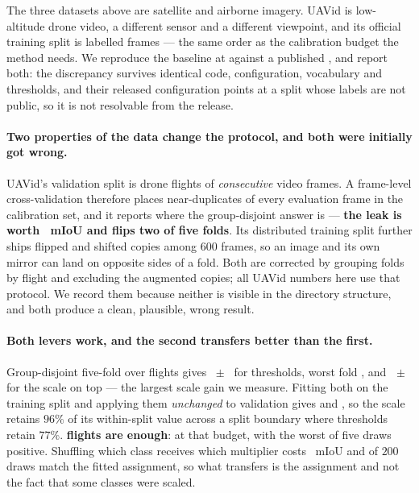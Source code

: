 \documentclass[10pt,a4paper]{article}                        %
\newcommand{\best}[1]{\textbf{#1}}
\begin{document}
The three datasets above are satellite and airborne imagery. UAVid is low-altitude
drone video, a different sensor and a different viewpoint, and its official
training split is \uavTrainTiles{} labelled frames --- the same order as the
calibration budget the method needs. We reproduce the baseline at \uavBase{}
against a published \uavPub{}, and report both: the \uavGap{} discrepancy survives
identical code, configuration, vocabulary and thresholds, and their released
configuration points at a split whose labels are not public, so it is not
resolvable from the release.

\paragraph{Two properties of the data change the protocol, and both were initially
got wrong.} UAVid's validation split is \uavValScenes{} drone flights of
\uavFrames{} \emph{consecutive} video frames. A frame-level cross-validation
therefore places near-duplicates of every evaluation frame in the calibration set,
and it reports \uavLeakA{} where the group-disjoint answer is \uavLeakB{} ---
\best{the leak is worth \uavLeak{}~mIoU and flips two of five folds}. Its
distributed training split further ships \uavAug{} flipped and shifted copies among
$600$ frames, so an image and its own mirror can land on opposite sides of a fold.
Both are corrected by grouping folds by flight and excluding the augmented copies;
all UAVid numbers here use that protocol. We record them because neither is visible
in the directory structure, and both produce a clean, plausible, wrong result.

\paragraph{Both levers work, and the second transfers better than the first.}
Group-disjoint five-fold over \uavScenes{} flights gives \uavTauCV{}~$\pm$~\uavTauSD{}
for thresholds, worst fold \uavTauWorst{}, and \best{\uavScaleCV{}~$\pm$~\uavScaleSD{}}
for the scale on top --- the largest scale gain we measure. Fitting both on the
training split and applying them \emph{unchanged} to validation gives \uavTauTrans{}
and \uavScaleTrans{}, so the scale retains $96\%$ of its within-split value across a
split boundary where thresholds retain $77\%$. \best{\uavCalibScenes{} flights are
enough}: \uavCalibGain{} at that budget, with the worst of five draws positive.
Shuffling which class receives which multiplier costs \uavScaleShuffle{}~mIoU and
\uavScalePerm{} of $200$ draws match the fitted assignment, so what transfers is the
assignment and not the fact that some classes were scaled.
\end{document}

